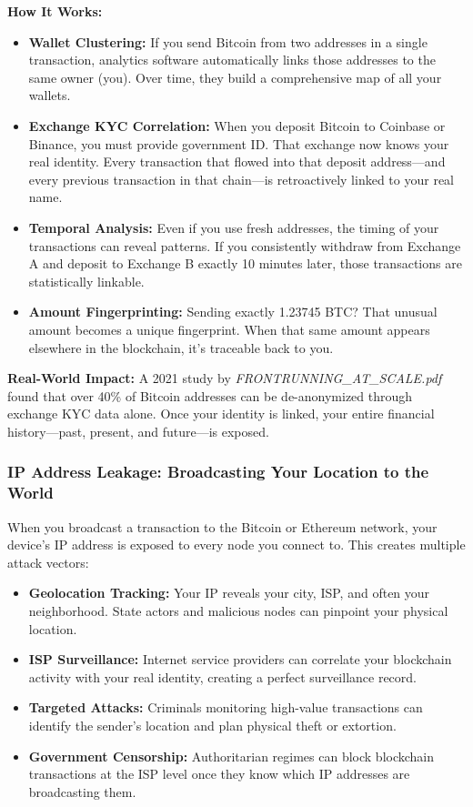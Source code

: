 \documentclass[11pt,a4paper]{article}
\begin{document}
\textbf{How It Works:}
\begin{itemize}
    \item \textbf{Wallet Clustering:} If you send Bitcoin from two addresses in a single transaction, analytics software automatically links those addresses to the same owner (you). Over time, they build a comprehensive map of all your wallets.

    \item \textbf{Exchange KYC Correlation:} When you deposit Bitcoin to Coinbase or Binance, you must provide government ID. That exchange now knows your real identity. Every transaction that flowed into that deposit address—and every previous transaction in that chain—is retroactively linked to your real name.

    \item \textbf{Temporal Analysis:} Even if you use fresh addresses, the timing of your transactions can reveal patterns. If you consistently withdraw from Exchange A and deposit to Exchange B exactly 10 minutes later, those transactions are statistically linkable.

    \item \textbf{Amount Fingerprinting:} Sending exactly 1.23745 BTC? That unusual amount becomes a unique fingerprint. When that same amount appears elsewhere in the blockchain, it's traceable back to you.
\end{itemize}

\textbf{Real-World Impact:} A 2021 study by \textit{FRONTRUNNING\_AT\_SCALE.pdf} found that over 40\% of Bitcoin addresses can be de-anonymized through exchange KYC data alone. Once your identity is linked, your entire financial history—past, present, and future—is exposed.

\subsubsection{IP Address Leakage: Broadcasting Your Location to the World}

When you broadcast a transaction to the Bitcoin or Ethereum network, your device's IP address is exposed to every node you connect to. This creates multiple attack vectors:

\begin{itemize}
    \item \textbf{Geolocation Tracking:} Your IP reveals your city, ISP, and often your neighborhood. State actors and malicious nodes can pinpoint your physical location.

    \item \textbf{ISP Surveillance:} Internet service providers can correlate your blockchain activity with your real identity, creating a perfect surveillance record.

    \item \textbf{Targeted Attacks:} Criminals monitoring high-value transactions can identify the sender's location and plan physical theft or extortion.

    \item \textbf{Government Censorship:} Authoritarian regimes can block blockchain transactions at the ISP level once they know which IP addresses are broadcasting them.
\end{itemize}
\end{document}
